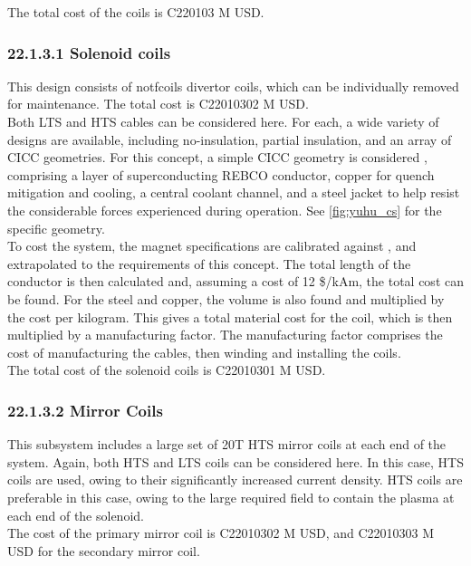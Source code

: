 The total cost of the coils is C220103 M USD.


\subsubsection*{22.1.3.1 Solenoid coils}

This design consists of notfcoils divertor coils, which can be individually removed for maintenance. The total cost is C22010302 M USD.\\

Both LTS and HTS cables can be considered here. For each, a wide variety of designs are available, including no-insulation, partial insulation, and an array of CICC geometries. For this concept, a simple CICC geometry is considered \cite{Menard2016}, comprising a layer of superconducting REBCO conductor, copper for quench mitigation and cooling, a central coolant channel, and a steel jacket to help resist the considerable forces experienced during operation. See \ref{fig:yuhu_cs} for the specific geometry.\\

To cost the system, the magnet specifications are calibrated against \cite{Menard2016}, and extrapolated to the requirements of this concept. The total length of the conductor is then calculated and, assuming a cost of 12 \$/kAm, the total cost can be found. For the steel and copper, the volume is also found and multiplied by the cost per kilogram. This gives a total material cost for the coil, which is then multiplied by a manufacturing factor. The manufacturing factor comprises the cost of manufacturing the cables, then winding and installing the coils. \\

The total cost of the solenoid coils is C22010301 M USD.


\subsubsection*{22.1.3.2 Mirror Coils}

This subsystem includes a large set of 20T HTS mirror coils at each end of the system. Again, both HTS and LTS coils can be considered here. In this case, HTS coils are used, owing to their significantly increased current density. HTS coils are preferable in this case, owing to the large required field to contain the plasma at each end of the solenoid.  \\

The cost of the primary mirror coil is C22010302 M USD, and C22010303 M USD for the secondary mirror coil. \\



